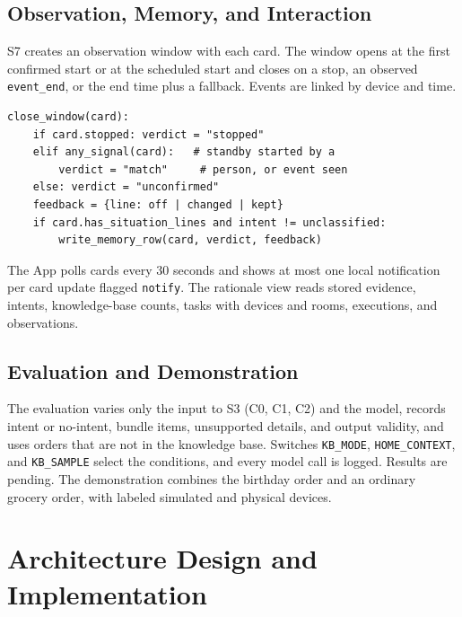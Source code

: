 \documentclass[conference]{IEEEtran}
\begin{document}
\subsection{Observation, Memory, and Interaction}
S7 creates an observation window with each card. The window opens at the first confirmed start or at the scheduled start and closes on a stop, an observed \texttt{event\_end}, or the end time plus a fallback. Events are linked by device and time.

\noindent\begin{minipage}{\columnwidth}
\begin{lstlisting}
close_window(card):
    if card.stopped: verdict = "stopped"
    elif any_signal(card):   # standby started by a
        verdict = "match"     # person, or event seen
    else: verdict = "unconfirmed"
    feedback = {line: off | changed | kept}
    if card.has_situation_lines and intent != unclassified:
        write_memory_row(card, verdict, feedback)
\end{lstlisting}
\end{minipage}
The App polls cards every 30 seconds and shows at most one local notification per card update flagged \texttt{notify}. The rationale view reads stored evidence, intents, knowledge-base counts, tasks with devices and rooms, executions, and observations.

\subsection{Evaluation and Demonstration}
The evaluation varies only the input to S3 (C0, C1, C2) and the model, records intent or no-intent, bundle items, unsupported details, and output validity, and uses orders that are not in the knowledge base. Switches \texttt{KB\_MODE}, \texttt{HOME\_CONTEXT}, and \texttt{KB\_SAMPLE} select the conditions, and every model call is logged. Results are pending. The demonstration combines the birthday order and an ordinary grocery order, with labeled simulated and physical devices.

\section{Architecture Design and Implementation}
\end{document}
